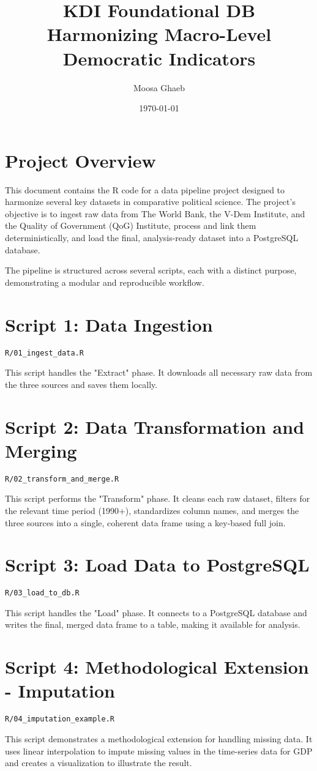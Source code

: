 \documentclass[11pt, a4paper]{article}
\title{
    \textbf{KDI Foundational DB} \\
    \large Harmonizing Macro-Level Democratic Indicators
}
\author{Moosa Ghaeb}
\date{\today}
\begin{document}
\maketitle

\section*{Project Overview}

This document contains the R code for a data pipeline project designed to harmonize several key datasets in comparative political science. The project's objective is to ingest raw data from The World Bank, the V-Dem Institute, and the Quality of Government (QoG) Institute, process and link them deterministically, and load the final, analysis-ready dataset into a PostgreSQL database.

The pipeline is structured across several scripts, each with a distinct purpose, demonstrating a modular and reproducible workflow.

\hrulefill
\vspace{1cm}


\section*{Script 1: Data Ingestion}
\texttt{R/01\_ingest\_data.R}

This script handles the "Extract" phase. It downloads all necessary raw data from the three sources and saves them locally.


\section*{Script 2: Data Transformation and Merging}
\texttt{R/02\_transform\_and\_merge.R}

This script performs the "Transform" phase. It cleans each raw dataset, filters for the relevant time period (1990+), standardizes column names, and merges the three sources into a single, coherent data frame using a key-based full join.


\section*{Script 3: Load Data to PostgreSQL}
\texttt{R/03\_load\_to\_db.R}

This script handles the "Load" phase. It connects to a PostgreSQL database and writes the final, merged data frame to a table, making it available for analysis.


\section*{Script 4: Methodological Extension - Imputation}
\texttt{R/04\_imputation\_example.R}

This script demonstrates a methodological extension for handling missing data. It uses linear interpolation to impute missing values in the time-series data for GDP and creates a visualization to illustrate the result.

\end{document}
